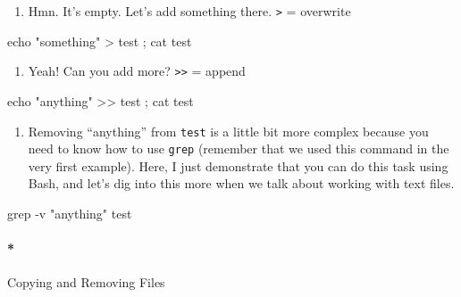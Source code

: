 \documentclass[
  letterpaper,
  DIV=11,
  numbers=noendperiod]{scrreprt}
\let\oldparagraph\paragraph
\renewcommand{\paragraph}[1]{\oldparagraph{#1}\mbox{}}
\newenvironment{Shaded}{\begin{snugshade}}{\end{snugshade}}
\newcommand{\AttributeTok}[1]{\textcolor[rgb]{0.40,0.45,0.13}{#1}}
\newcommand{\BuiltInTok}[1]{\textcolor[rgb]{0.00,0.23,0.31}{#1}}
\newcommand{\FunctionTok}[1]{\textcolor[rgb]{0.28,0.35,0.67}{#1}}
\newcommand{\KeywordTok}[1]{\textcolor[rgb]{0.00,0.23,0.31}{#1}}
\newcommand{\NormalTok}[1]{\textcolor[rgb]{0.00,0.23,0.31}{#1}}
\newcommand{\OperatorTok}[1]{\textcolor[rgb]{0.37,0.37,0.37}{#1}}
\newcommand{\StringTok}[1]{\textcolor[rgb]{0.13,0.47,0.30}{#1}}
\providecommand{\tightlist}{%
  \setlength{\itemsep}{0pt}\setlength{\parskip}{0pt}}\usepackage{longtable,booktabs,array}
\begin{document}
\begin{enumerate}
\def\labelenumi{\arabic{enumi}.}
\setcounter{enumi}{4}
\tightlist
\item
  Hmn. It's empty. Let's add something there. \texttt{\textgreater{}} =
  overwrite
\end{enumerate}

\begin{Shaded}
\begin{Highlighting}[]

\BuiltInTok{echo} \StringTok{"something"} \OperatorTok{\textgreater{}}\NormalTok{ test }\KeywordTok{;} \FunctionTok{cat}\NormalTok{ test }
\end{Highlighting}
\end{Shaded}

\begin{enumerate}
\def\labelenumi{\arabic{enumi}.}
\setcounter{enumi}{5}
\tightlist
\item
  Yeah! Can you add more? \texttt{\textgreater{}\textgreater{}} = append
\end{enumerate}

\begin{Shaded}
\begin{Highlighting}[]

\BuiltInTok{echo} \StringTok{"anything"} \OperatorTok{\textgreater{}\textgreater{}}\NormalTok{ test }\KeywordTok{;} \FunctionTok{cat}\NormalTok{ test }
\end{Highlighting}
\end{Shaded}

\begin{enumerate}
\def\labelenumi{\arabic{enumi}.}
\setcounter{enumi}{6}
\tightlist
\item
  Removing ``anything'' from \texttt{test} is a little bit more complex
  because you need to know how to use \texttt{grep} (remember that we
  used this command in the very first example). Here, I just demonstrate
  that you can do this task using Bash, and let's dig into this more
  when we talk about working with text files.
\end{enumerate}

\begin{Shaded}
\begin{Highlighting}[]

\FunctionTok{grep} \AttributeTok{{-}v} \StringTok{"anything"}\NormalTok{ test}
\end{Highlighting}
\end{Shaded}

\hypertarget{copying-and-removing-files}{%
\paragraph*{Copying and Removing
Files}\label{copying-and-removing-files}}
\end{document}
